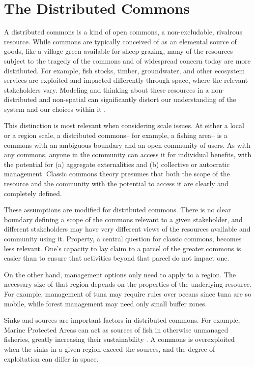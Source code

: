 \documentclass[12pt, oneside]{amsart}
\begin{document}
\section*{The Distributed Commons}


A distributed commons is a kind of open commons, a non-excludable, rivalrous resource.  While commons are typically conceived of as an elemental source of goods, like a village green available for sheep grazing, many of the resources subject to the tragedy of the commons and of widespread concern today are more distributed.  For example, fish stocks, timber, groundwater, and other ecosystem services are exploited and impacted differently through space, where the relevant stakeholders vary.  Modeling and thinking about these resources in a non-distributed and non-spatial can significantly distort our understanding of the system and our choices within it \citep{durrett1994importance}.

This distinction is most relevant when considering scale issues.  At either a local or a region scale, a distributed commons-- for example, a fishing area-- is a commons with an ambiguous boundary and an open community of users.  As with any commons, anyone in the community can access it for individual benefits, with the potential for (a) aggregate externalities and (b) collective or autocratic management.  Classic commons theory presumes that both the scope of the resource and the community with the potential to access it are clearly and completely defined.

These assumptions are modified for distributed commons.  There is no clear boundary defining a scope of the commons relevant to a given stakeholder, and different stakeholders may have very different views of the resources available and community using it.  Property, a central question for classic commons, becomes less relevant.  One's capacity to lay claim to a parcel of the greater commons is easier than to ensure that activities beyond that parcel do not impact one.

On the other hand, management options only need to apply to a region.  The necessary size of that region depends on the properties of the underlying resource.  For example, management of tuna may require rules over oceans since tuna are so mobile, while forest management may need only small buffer zones.

Sinks and sources are important factors in distributed commons.  For example, Marine Protected Areas can act as sources of fish in otherwise unmanaged fisheries, greatly increasing their sustainability \citep{gell2003benefits}.  A commons is overexploited when the sinks in a given region exceed the sources, and the degree of exploitation can differ in space.
\end{document}
